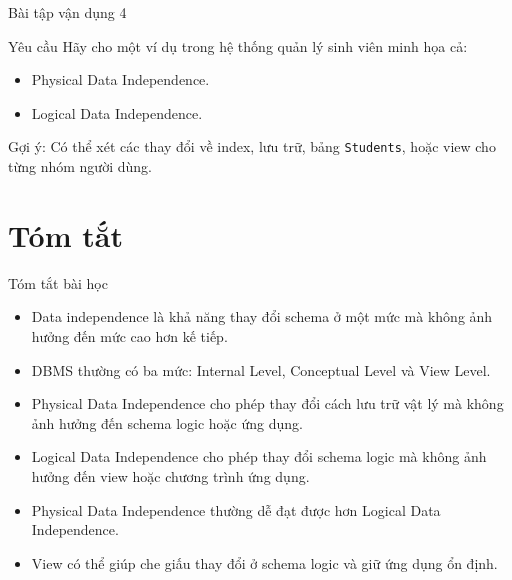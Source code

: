 \documentclass[aspectratio=169,11pt]{beamer}
\begin{document}
\begin{frame}{Bài tập vận dụng 4}
\begin{block}{Yêu cầu}
Hãy cho một ví dụ trong hệ thống quản lý sinh viên minh họa cả:
\begin{itemize}
  \item Physical Data Independence.
  \item Logical Data Independence.
\end{itemize}
\end{block}

\vspace{0.3cm}
Gợi ý: Có thể xét các thay đổi về index, lưu trữ, bảng \texttt{Students}, hoặc view cho từng nhóm người dùng.
\end{frame}

\section{Tóm tắt}

\begin{frame}{Tóm tắt bài học}
\begin{itemize}
  \item Data independence là khả năng thay đổi schema ở một mức mà không ảnh hưởng đến mức cao hơn kế tiếp.
  \item DBMS thường có ba mức: Internal Level, Conceptual Level và View Level.
  \item Physical Data Independence cho phép thay đổi cách lưu trữ vật lý mà không ảnh hưởng đến schema logic hoặc ứng dụng.
  \item Logical Data Independence cho phép thay đổi schema logic mà không ảnh hưởng đến view hoặc chương trình ứng dụng.
  \item Physical Data Independence thường dễ đạt được hơn Logical Data Independence.
  \item View có thể giúp che giấu thay đổi ở schema logic và giữ ứng dụng ổn định.
\end{itemize}
\end{frame}
\end{document}
